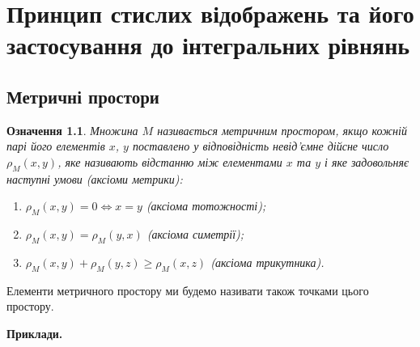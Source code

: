 \documentclass[14pt,twoside]{extreport}
\theoremstyle{mystyle}
\newtheorem{dfn}{Означення}
\numberwithin{equation}{chapter}
\begin{document}
\chapter{Принцип стислих відображень та його застосування до інтегральних рівнянь}

\section{Метричні простори}

\begin{dfn}
Множина $M$ називається метричним простором, якщо кожній парі його елементів $x$, $y$ поставлено у відповідність невід'ємне дійсне число $\rho_M(x, y)$, яке називають відстанню між елементами $x$ та $y$ і яке задовольняє наступні умови (аксіоми метрики):
\begin{enumerate}
 \item $\rho_M(x, y) = 0\Leftrightarrow x=y$ (аксіома тотожності);
 \item $\rho_M(x, y) = \rho_M(y,x)$ (аксіома симетрії);
 \item $\rho_M(x, y) + \rho_M(y, z) \geqslant \rho_M (x, z)$ (аксіома трикутника).
\end{enumerate}
\end{dfn}

Елементи метричного простору ми будемо називати також точками цього простору.

\textbf{Приклади.}
\end{document}
